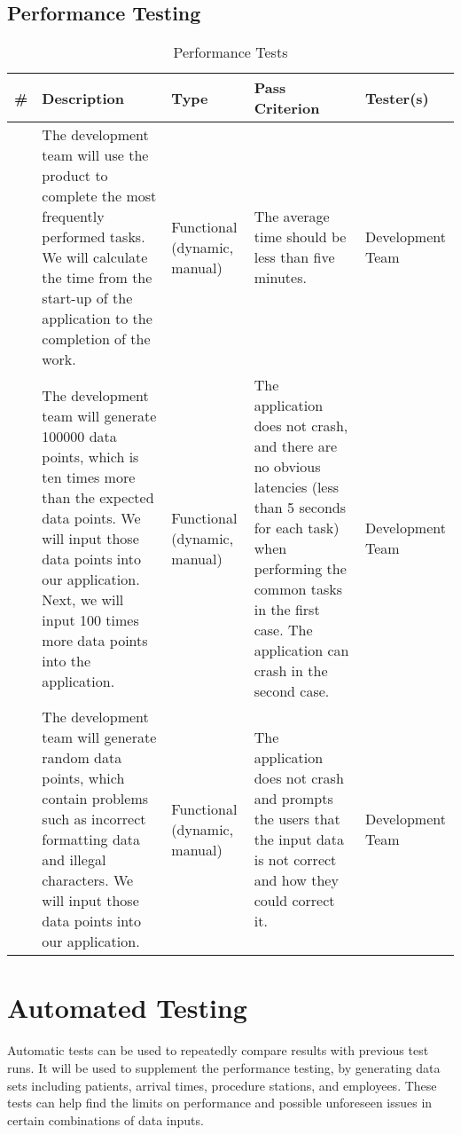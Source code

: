 \documentclass[12pt]{article}
\newcounter{TestCounter}
\begin{document}
\subsection{Performance Testing}
\begin{center}
	\begin{longtable}{c>{\raggedright\arraybackslash}p{4.8cm} >{\raggedright\arraybackslash}p{3.5cm}>{\raggedright\arraybackslash}p{3cm}>{\raggedright\arraybackslash}p{3cm}}
		\caption{Performance Tests}\label{Performance Tests}\\
		\toprule
		\bf \# & \bf Description & \bf Type & \bf Pass Criterion & Tester(s) \\\midrule
		\stepcounter{TestCounter}\arabic{TestCounter} 
		& The development team will use the product to complete the most frequently performed tasks.
		We will calculate the time from the start-up of the application to the completion of the work.
		& Functional (dynamic, manual)	
		& The average time should be less than five minutes.  
		& 	Development Team
		\\\midrule
		\stepcounter{TestCounter}\arabic{TestCounter} 
		& The development team will generate 100000 data points, which is ten times more
		than the expected data points. We will input those data points into our
		application. Next, we will input 100 times more data points into the application.
		& Functional (dynamic, manual)	
		& The application does not crash, and there are no obvious latencies
		(less than 5 seconds for each task) when performing
		the common tasks in the first case. The application can crash in the second case.  
		& 	Development Team
		\\\midrule
		\stepcounter{TestCounter}\arabic{TestCounter} 
		& The development team will generate random data points, which contain problems such as
		incorrect formatting data and illegal characters. We will input those data points into
		our application.
		& Functional (dynamic, manual)	
		& The application does not crash and prompts the users that the input data is not
		correct and how they could correct it.  
		& 	Development Team
		\\\midrule
		\bottomrule
	\end{longtable}
\end{center}

\section{Automated Testing}
Automatic tests can be used to repeatedly compare results with previous test runs. It will be used to supplement the performance testing, by generating data sets including patients, arrival times, procedure stations, and employees. These tests can help find the limits on performance and possible unforeseen issues in certain combinations of data inputs.
\end{document}
